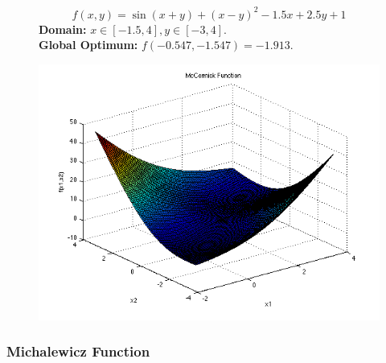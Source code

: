 \begin{figure}[H]
    \centering
    \begin{minipage}{0.65\textwidth}
        \begin{equation}
            f(x, y) = \sin(x + y) + (x - y)^2 - 1.5x + 2.5y + 1
        \end{equation}
        \textbf{Domain:} \( x \in [-1.5, 4], y \in [-3, 4] \). \\
        \textbf{Global Optimum:} \( f(-0.547, -1.547) = -1.913 \).
    \end{minipage}
    \hfill
    \begin{minipage}{0.3\textwidth}
        \centering
        \includegraphics[width=\textwidth]{figures/mccormick_function.png}
    \end{minipage}
\end{figure}

\subsubsection{Michalewicz Function}

